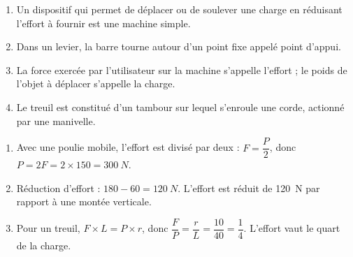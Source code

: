 \documentclass[11pt]{article}
\newcommand{\cle}[1]{{\popxbold\color{popdark}#1}}
\begin{document}
\begin{corrige}
\begin{enumerate}
\item Un dispositif qui permet de déplacer ou de soulever une charge en réduisant l'effort à fournir est une \cle{machine simple}.
\item Dans un levier, la barre tourne autour d'un point fixe appelé \cle{point d'appui}.
\item La force exercée par l'utilisateur sur la machine s'appelle l'\cle{effort} ; le poids de l'objet à déplacer s'appelle la \cle{charge}.
\item Le \cle{treuil} est constitué d'un tambour sur lequel s'enroule une corde, actionné par une manivelle.
\end{enumerate}
\end{corrige}

\begin{corrige}
\begin{enumerate}
\item Avec une poulie mobile, l'effort est divisé par deux : $F = \dfrac{P}{2}$, donc $P = 2F = 2 \times 150 = \SI{300}{N}$.
\item Réduction d'effort : $180 - 60 = \SI{120}{N}$. L'effort est réduit de \SI{120}{N} par rapport à une montée verticale.
\item Pour un treuil, $F \times L = P \times r$, donc $\dfrac{F}{P} = \dfrac{r}{L} = \dfrac{10}{40} = \dfrac{1}{4}$. L'effort vaut le quart de la charge.
\end{enumerate}
\end{corrige}
\end{document}

